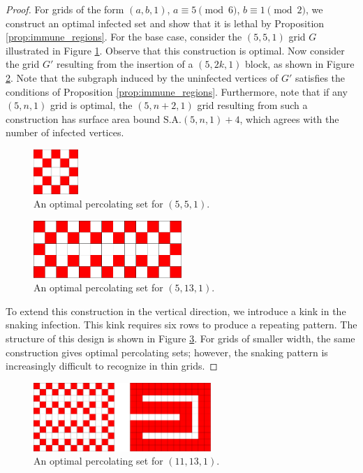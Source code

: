 \begin{proof}
For grids of the form $(a,b,1)$, $a \equiv 5 \pmod 6$, $b \equiv 1 \pmod 2$, we construct an optimal infected set and show that it is lethal by Proposition \ref{prop:immune_regions}. For the base case, consider the $(5,5,1)$ grid $G$ illustrated in Figure \ref{fig:5x5x1}. Observe that this construction is optimal. Now consider the grid $G'$ resulting from the insertion of a $(5, 2k, 1)$ block, as shown in Figure \ref{fig:5x13x1}. Note that the subgraph induced by the uninfected vertices of $G'$ satisfies the conditions of Proposition \ref{prop:immune_regions}. Furthermore, note that if any $(5, n, 1)$ grid is optimal, the $(5,n+2,1)$ grid resulting from such a construction has surface area bound $\text{S.A.}(5,n,1) + 4$, which agrees with the number of infected vertices.

\begin{figure}[]
\centering
\includegraphics[width=0.15\textwidth]{figures/7/5x5x1.pdf}
\caption{An optimal percolating set for $(5,5,1)$.}
\label{fig:5x5x1}
\end{figure} 

\begin{figure}[]
\centering
\includegraphics[width=0.5\textwidth]{figures/7/5x13x1.pdf}
\caption{An optimal percolating set for $(5,13,1)$.}
\label{fig:5x13x1}
\end{figure} 

To extend this construction in the vertical direction, we introduce a kink in the snaking infection. This kink requires six rows to produce a repeating pattern. The structure of this design is shown in Figure \ref{fig:11x13x1}. For grids of smaller width, the same construction gives optimal percolating sets; however, the snaking pattern is increasingly difficult to recognize in thin grids.
\end{proof}

\begin{figure}[]
\centering
\includegraphics[width=0.6\textwidth]{figures/7/11x13x1.pdf}
\caption{An optimal percolating set for $(11,13,1)$.}
\label{fig:11x13x1}
\end{figure} 

